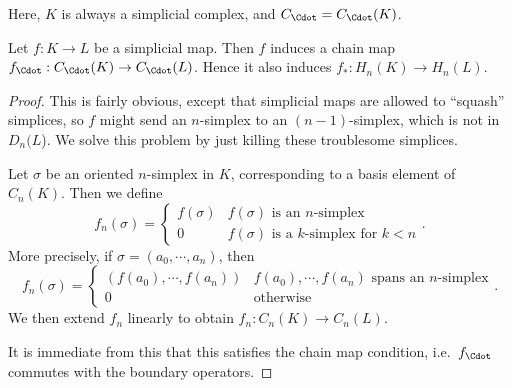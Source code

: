 \documentclass[a4paper]{article}
\begin{document}
Here, $K$ is always a simplicial complex, and $C_{\Cdot} = C_{\Cdot}(K)$.
\begin{lemma}
  Let $f: K \to L$ be a simplicial map. Then $f$ induces a chain map $f_{\Cdot}: C_{\Cdot}(K) \to C_{\Cdot}(L)$. Hence it also induces $f_*: H_n (K) \to H_n(L)$.
\end{lemma}

\begin{proof}
  This is fairly obvious, except that simplicial maps are allowed to ``squash'' simplices, so $f$ might send an $n$-simplex to an $(n - 1)$-simplex, which is not in $D_n(L$). We solve this problem by just killing these troublesome simplices.

  Let $\sigma$ be an oriented $n$-simplex in $K$, corresponding to a basis element of $C_n(K)$. Then we define
  \[
    f_n(\sigma) =
    \begin{cases}
      f(\sigma) & f(\sigma)\text{ is an $n$-simplex}\\
      0 & f(\sigma)\text{ is a $k$-simplex for }k < n
    \end{cases}.
  \]
  More precisely, if $\sigma = (a_0, \cdots, a_n)$, then
  \[
    f_n(\sigma) =
    \begin{cases}
      (f(a_0), \cdots, f(a_n)) & {f(a_0), \cdots, f(a_n)}\text{ spans an $n$-simplex}\\
      0 & \text{otherwise}
    \end{cases}.
  \]
  We then extend $f_n$ linearly to obtain $f_n: C_n(K) \to C_n(L)$.

  It is immediate from this that this satisfies the chain map condition, i.e.\ $f_{\Cdot}$ commutes with the boundary operators.
\end{proof}
\end{document}
